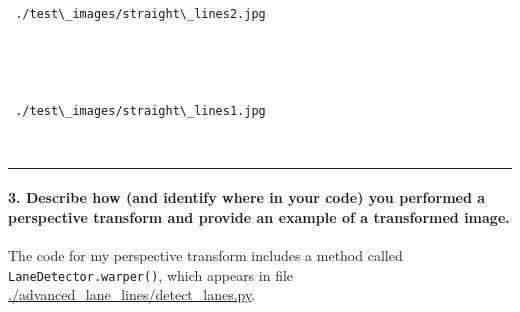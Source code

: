 \documentclass[11pt]{article}
\begin{document}
    \begin{center}
    \end{center}
    { \hspace*{\fill} \\}
    
    \begin{Verbatim}[commandchars=\\\{\}]


 ./test\_images/straight\_lines2.jpg

    \end{Verbatim}

    \begin{center}
    \end{center}
    { \hspace*{\fill} \\}
    
    \begin{Verbatim}[commandchars=\\\{\}]


 ./test\_images/straight\_lines1.jpg

    \end{Verbatim}

    \begin{center}
    \end{center}
    { \hspace*{\fill} \\}
    
    \begin{center}\rule{0.5\linewidth}{\linethickness}\end{center}

\hypertarget{describe-how-and-identify-where-in-your-code-you-performed-a-perspective-transform-and-provide-an-example-of-a-transformed-image.}{%
\paragraph{3. Describe how (and identify where in your code) you
performed a perspective transform and provide an example of a
transformed
image.}\label{describe-how-and-identify-where-in-your-code-you-performed-a-perspective-transform-and-provide-an-example-of-a-transformed-image.}}

The code for my perspective transform includes a method called
\texttt{LaneDetector.warper()}, which appears in file
\href{./advanced-lane-lines/detect-lanes.py}{./advanced\_lane\_lines/detect\_lanes.py}.
\end{document}

